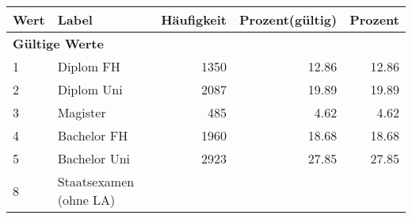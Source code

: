      \begin{longtable}{lXrrr}
     \toprule
     \textbf{Wert} & \textbf{Label} & \textbf{Häufigkeit} & \textbf{Prozent(gültig)} & \textbf{Prozent} \\
     \endhead
     \midrule
     \multicolumn{5}{l}{\textbf{Gültige Werte}}\\

     1 &
     \multicolumn{1}{X}{ Diplom FH   } &


       \num{1350} &
       \num[round-mode=places,round-precision=2]{12,86} &
         \num[round-mode=places,round-precision=2]{12,86} \\

     2 &
     \multicolumn{1}{X}{ Diplom Uni   } &


       \num{2087} &
       \num[round-mode=places,round-precision=2]{19,89} &
         \num[round-mode=places,round-precision=2]{19,89} \\

     3 &
     \multicolumn{1}{X}{ Magister   } &


       \num{485} &
       \num[round-mode=places,round-precision=2]{4,62} &
         \num[round-mode=places,round-precision=2]{4,62} \\

     4 &
     \multicolumn{1}{X}{ Bachelor FH   } &


       \num{1960} &
       \num[round-mode=places,round-precision=2]{18,68} &
         \num[round-mode=places,round-precision=2]{18,68} \\

     5 &
     \multicolumn{1}{X}{ Bachelor Uni   } &


       \num{2923} &
       \num[round-mode=places,round-precision=2]{27,85} &
         \num[round-mode=places,round-precision=2]{27,85} \\

     8 &
     \multicolumn{1}{X}{ Staatsexamen (ohne LA)   } &



\end{longtable}
